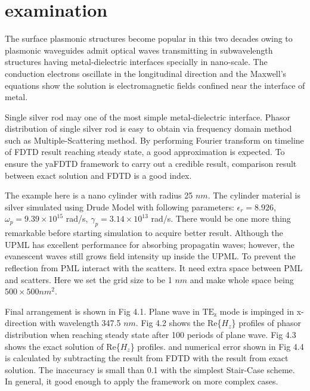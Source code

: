 \section{examination}
The surface plasmonic structures become popular in this two decades owing to plasmonic waveguides admit optical waves
transmitting in subwavelength structures having metal-dielectric interfaces specially in nano-scale. The conduction
electrons oscillate in the longitudinal direction and the Maxwell's equations show the solution is electromagnetic
fields confined near the interface of metal.

Single silver rod may one of the most simple metal-dielectric interface. Phasor distribution of single silver rod is
easy to obtain via frequency domain method such as Multiple-Scattering method. By performing Fourier transform on
timeline of FDTD result reaching steady state, a good approximation is expected. To ensure the yaFDTD framework to carry
out a credible result, comparison result between exact solution and FDTD is a good index.

The example here is a nano cylinder with radius 25 $nm$. The cylinder material is silver simulated using Drude Model
with following parameters: $\epsilon_r = 8.926$, $\omega_p = 9.39 \times 10^{15}$ rad/s, $\gamma_p = 3.14 \times
10^{13}$ rad/s.  There would be one more thing remarkable before starting simulation to acquire better result. Although
the UPML has excellent performance for absorbing propagatin waves; however, the evanescent waves still grows field
intensity up inside the UPML. To prevent the reflection from PML interact with the scatters. It need extra space between
PML and scatters. Here we set the grid size to be 1 $nm$ and make whole space being $500 \times 500 nm^2$.

Final arrangement is shown in Fig 4.1. Plane wave in $\mathrm{TE_z}$ mode is impinged in x-direction with wavelength
347.5 $nm$. Fig 4.2 shows the Re\{$H_z$\} profiles of phasor distribution when reaching steady state after 100 periods of
plane wave. Fig 4.3 shows the exact solution of Re\{$H_z$\} profiles. and numerical error shown in Fig 4.4 is calculated
by subtracting the result from FDTD with the result from exact solution. The inaccuracy is small than 0.1 with the
simplest Stair-Case scheme. In general, it good enough to apply the framework on more complex cases.
